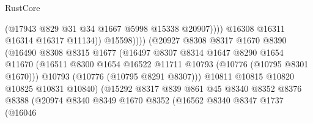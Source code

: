 \begin{lexlean}{RustCore}
\begin{coremodule}
                                                  (@17943 @829 @31 @34 @1667 @5998 @15338 @20907))))
                                            @16308
                                            @16311
                                            @16314
                                            @16317
                                            @11134))
                                        @15598))))
                                (@20927
                                  @8308
                                  @8317
                                  @1670
                                  @8390
                                  (@16490
                                    @8308
                                    @8315
                                    @1677
                                    (@16497
                                      @8307
                                      @8314
                                      @1647
                                      @8290
                                      @1654
                                      @11670
                                      (@16511
                                        @8300
                                        @1654
                                        @16522
                                        @11711
                                        @10793
                                        (@10776 (@10795 @8301 @1670)))
                                      @10793
                                      (@10776 (@10795 @8291 @8307)))
                                    @10811
                                    @10815
                                    @10820
                                    @10825
                                    @10831
                                    @10840)
                                  (@15292
                                    @8317
                                    @839
                                    @861
                                    @45
                                    @8340
                                    @8352
                                    @8376
                                    @8388
                                    (@20974
                                      @8340
                                      @8349
                                      @1670
                                      @8352
                                      (@16562
                                        @8340
                                        @8347
                                        @1737
                                        (@16046

\end{coremodule}
\end{lexlean}
